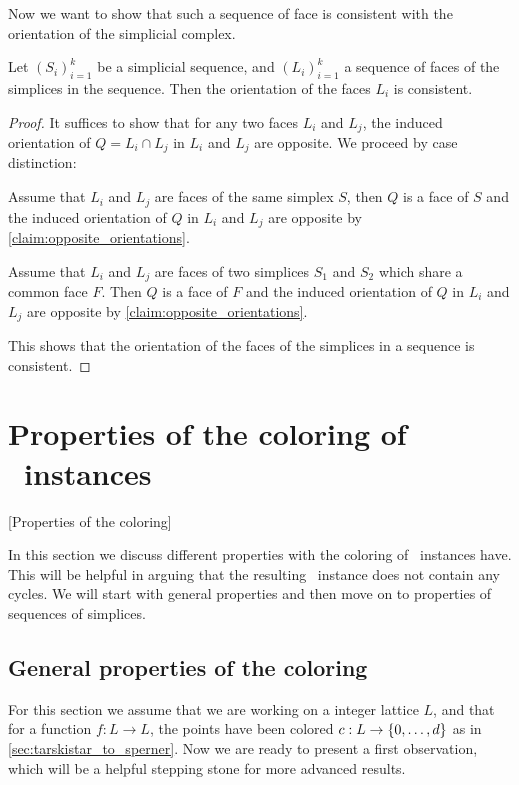 Now we want to show that such a sequence of face is consistent with the orientation of the simplicial complex.
\begin{proposition}
	\label{prop:orientation_of_sequences_of_faces}
	Let $\left(S_i\right)_{i=1}^{k}$ be a simplicial sequence, and $\left(L_i\right)_{i=1}^{k}$ a sequence of faces of the simplices in the sequence. Then the orientation of the faces $L_i$ is consistent.
\end{proposition}
\begin{proof}
	It suffices to show that for any two faces $L_i$ and $L_j$, the induced orientation of $Q = L_i \cap L_j$ in $L_i$ and $L_j$ are opposite. We proceed by case distinction:
	\begin{case}{1}
		Assume that $L_i$ and $L_j$ are faces of the same simplex $S$, then $Q$ is a face of $S$ and the induced orientation of $Q$ in $L_i$ and $L_j$ are opposite by \cref{claim:opposite_orientations}.
	\end{case}
	\begin{case}{2}
		Assume that $L_i$ and $L_j$ are faces of two simplices $S_1$ and $S_2$ which share a common face $F$. Then $Q$ is a face of $F$ and the induced orientation of $Q$ in $L_i$ and $L_j$ are opposite by \cref{claim:opposite_orientations}.
	\end{case}
	This shows that the orientation of the faces of the simplices in a sequence is consistent.
\end{proof}

\section{Properties of the coloring of \Tarski\ instances}[Properties of the coloring]

In this section we discuss different properties with the coloring of \Tarski\ instances have. This will be helpful in arguing that the resulting \EndOfLine\ instance does not contain any cycles. We will start with general properties and then move on to properties of sequences of simplices.

\subsection{General properties of the coloring}

For this section we assume that we are working on a integer lattice $L$, and that for a function $f : L \rightarrow L$, the points have been colored $c : L \rightarrow \left\{0, \dots, d\right\}$ as in \cref{sec:tarskistar_to_sperner}. Now we are ready to present a first observation, which will be a helpful stepping stone for more advanced results.

